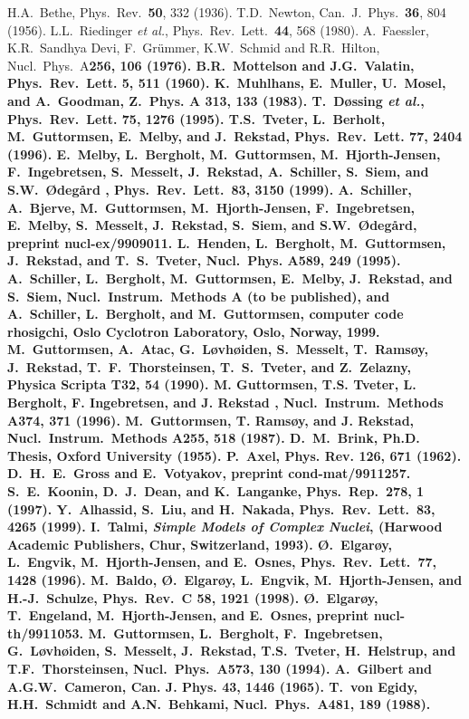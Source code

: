\begin{references}
 H.A.~Bethe, Phys.~Rev.~{\bf 50}, 332 (1936).
 T.D.~Newton, Can.~J.~Phys.~{\bf 36}, 804 (1956).
 L.L.~Riedinger {\sl et al.}, Phys.\ Rev.\ Lett.\ {\bf 44}, 568 (1980).
 A.~Faessler, K.R.~Sandhya Devi, F.~Gr\"ummer, K.W.~Schmid and R.R.~Hilton, Nucl.\ Phys.\ A\bf 256\rm, 106 (1976). 
 B.R.~Mottelson and J.G.~Valatin, Phys.~Rev.~Lett. {\bf 5}, 511 (1960).
 K.~Muhlhans, E.~Muller, U.~Mosel, and A.~Goodman, Z.~Phys. {\bf A 313}, 133 (1983).
 T.~D{\o}ssing {\sl et al.}, Phys.~Rev.~Lett. {\bf 75}, 1276 (1995).
 T.S.~Tveter, L.~Berholt, M.~Guttormsen, E.~Melby, and J.~Rekstad, Phys.~Rev.~Lett. {\bf 77}, 2404 (1996).
 E.~Melby, L.~Bergholt, M.~Guttormsen, M.~Hjorth-Jensen, F.~Ingebretsen, S.~Messelt, J.~Rekstad, A.~Schiller, S.~Siem, and S.W.~{\O}deg{\aa}rd \rm, Phys.\ Rev.\ Lett.\ {\bf 83}, 3150 (1999). 
 A.~Schiller, A.~Bjerve, M.~Guttormsen, M.~Hjorth-Jensen, F.~Ingebretsen, E.~Melby, S.~Messelt, J.~Rekstad, S.~Siem, and S.W.~{\O}deg{\aa}rd, preprint nucl-ex/9909011.
 L.~Henden, L.~Bergholt, M.~Guttormsen, J.~Rekstad, and T.~S.~Tveter, Nucl.~Phys. A{\bf 589}, 249 (1995).
 A.~Schiller, L.~Bergholt, M.~Guttormsen, E.~Melby, J.~Rekstad, and S.~Siem, Nucl.~Instrum.~Methods A (to be published), and A.~Schiller, L.~Bergholt, and M.~Guttormsen, computer code \sc rhosigchi\rm, Oslo Cyclotron Laboratory, Oslo, Norway, 1999.
 M.~Guttormsen, A.~Atac, G.~L{\o}vh{\o}iden, S.~Messelt, T.~Rams{\o}y, J.~Rekstad, T.~F.~Thorsteinsen, T.~S.~Tveter, and Z.~Zelazny, Physica Scripta T{\bf 32}, 54 (1990).
 M. Guttormsen, T.S. Tveter, L. Bergholt, F. Ingebretsen, and J. Rekstad \rm, Nucl.\ Instrum.\ Methods A\bf 374\rm, 371 (1996).
 M.~Guttormsen, T. Rams{\o}y, and J. Rekstad, Nucl.\ Instrum.\ Methods A\bf 255\rm, 518 (1987).
 D.~M.~Brink, Ph.D. Thesis, Oxford University (1955).
 P.~Axel, Phys. Rev. {\bf 126}, 671 (1962).
 D.~H.~E.~Gross and E.~Votyakov, preprint cond-mat/9911257.
 S.~E.~Koonin, D.~J.~Dean, and K.~Langanke,
                Phys.~Rep.\ {\bf 278}, 1 (1997).
 Y.~Alhassid, S.~Liu, and H.~Nakada, Phys.~Rev.~Lett.~{\bf 83},
                4265 (1999). 
 I.~Talmi, {\em Simple Models of Complex Nuclei}, (Harwood Academic Publishers, Chur, Switzerland, 1993).
 \O.~Elgar\o y, L.~Engvik, M.~Hjorth-Jensen, and E.~Osnes, Phys.~Rev.~Lett.\ {\bf 77}, 1428 (1996).
 M.~Baldo, \O.~Elgar\o y, L.~Engvik, M.~Hjorth-Jensen, and H.-J.~Schulze, Phys.~Rev.\ {\bf C 58}, 1921 (1998).
 \O.~Elgar\o y, T.~Engeland, M.~Hjorth-Jensen, and E.~Osnes, preprint nucl-th/9911053.
 M.~Guttormsen, L.~Bergholt, F.~Ingebretsen, G.~L{\o}vh{\o}iden, S.~Messelt, J.~Rekstad, T.S.~Tveter, H.~Helstrup, and T.F.~Thorsteinsen, Nucl.~Phys.~A{\bf 573}, 130 (1994).
 A.~Gilbert and A.G.W.~Cameron, Can. J. Phys. {\bf 43}, 1446 (1965). 
 T.~von Egidy, H.H.~Schmidt and A.N.~Behkami, Nucl.~Phys.~A{\bf 481}, 189 (1988).
\end{references}

